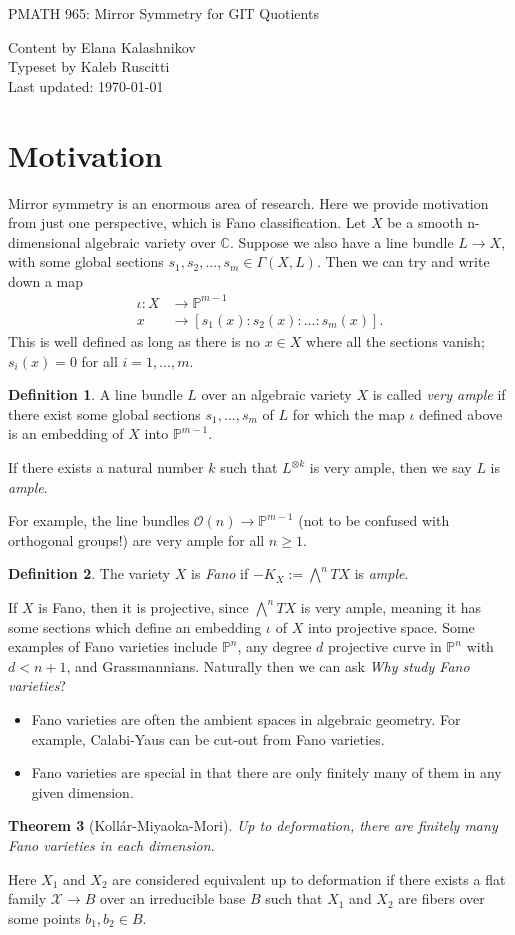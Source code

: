 \documentclass{article}
\title{}
\author{}
\newtheorem{theorem}{Theorem}
\theoremstyle{definition}
\newtheorem{definition}[theorem]{Definition}
\theoremstyle{remark}
\numberwithin{theorem}{section}
\newcommand{\C}{\mathbb{C}}
\newcommand{\bP}{\mathbb{P}}
\newcommand{\OO}{\mathcal{O}}
\newenvironment{thm}{
\begin{mdframed}
	\vspace{-0.5em}
	\begin{theorem}
}{
	\end{theorem}
\end{mdframed}
}
\newenvironment{defn}{
	\begin{mdframed}
		\vspace{-0.5em}
		\begin{definition}
		}{
		\end{definition}
	\end{mdframed}
}
\begin{document}
\centerline{\Large{PMATH 965: Mirror Symmetry for GIT Quotients} \vspace{1em}}
\small{
\noindent Content by Elana Kalashnikov \\
\noindent Typeset by Kaleb Ruscitti\\
\noindent Last updated: \today \vspace{1em}
}
\section{Motivation}
Mirror symmetry is an enormous area of research. Here we provide motivation from just one perspective, which is Fano classification. Let $X$ be a smooth n-dimensional algebraic variety over $\C$. Suppose we also have a line bundle $L \to X$, with some global sections $s_1, s_2,...,s_m \in \Gamma(X,L)$. Then we can try and write down a map
\begin{align*}
	\iota: X &\rightarrow \bP^{m-1}\\
	x &\rightarrow [s_1(x):s_2(x):...:s_m(x)].
\end{align*}
This is well defined as long as there is no $x \in X$ where all the sections vanish; $s_i(x)=0$ for all $i=1,...,m$.
\begin{defn}
	A line bundle $L$ over an algebraic variety $X$ is called \emph{very ample} if there exist some global sections $s_1,...,s_m$ of $L$ for which the map $\iota$ defined above is an embedding of $X$ into $\bP^{m-1}$. \vspace{1em}
	
	If there exists a natural number $k$ such that $L^{\otimes k}$ is very ample, then we say $L$ is \emph{ample}.
\end{defn}
For example, the line bundles $\OO(n) \rightarrow \bP^{m-1}$ (not to be confused with orthogonal groups!) are very ample for all $n\geq 1$.
\begin{defn}
	The variety $X$ is \emph{Fano} if $-K_X := \bigwedge^n TX$ is \emph{ample}.	
\end{defn}
If $X$ is Fano, then it is projective, since $\bigwedge^n TX$ is very ample, meaning it has some sections which define an embedding $\iota$ of $X$ into projective space. Some examples of Fano varieties include $\bP^{n}$, any degree $d$ projective curve in $\bP^n$ with $d<n+1$, and Grassmannians. Naturally then we can ask \emph{Why study Fano varieties}? 
\begin{itemize}
	\item Fano varieties are often the ambient spaces in algebraic geometry. For example, Calabi-Yaus can be cut-out from Fano varieties.
	\item Fano varieties are special in that there are only finitely many of them in any given dimension.
\end{itemize}
\begin{thm}[Koll\'ar-Miyaoka-Mori]
	Up to \emph{deformation}, there are finitely many Fano varieties in each dimension.
\end{thm}
Here $X_1$ and $X_2$ are considered equivalent up to deformation if there exists a flat family $\mathcal{X}\to B$ over an irreducible base $B$ such that $X_1$ and $X_2$ are fibers over some points $b_1, b_2 \in B$. \vspace{1em}
\end{document}
